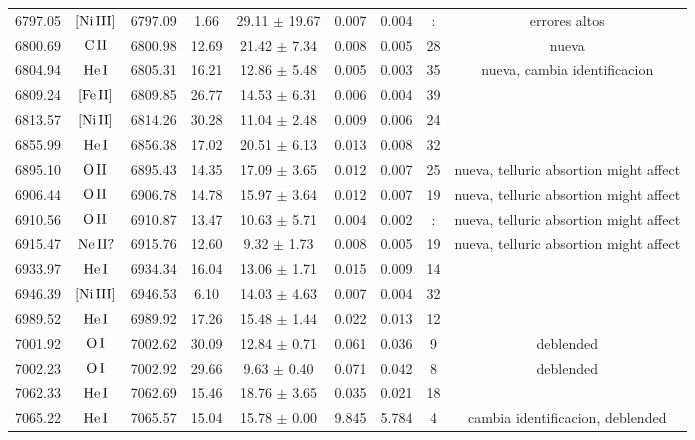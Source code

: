 \documentclass{article}
\begin{document}
\begin{table*}
\begin{adjustbox}{width=\textwidth}
\begin{tabular}{ccccccccc}
6797.05 & $\mbox{[Ni}\thinspace \mbox{III]}$ & 6797.09 & 1.66 & 29.11 $\pm$ 19.67 & 0.007 & 0.004 & : &  errores altos \\
6800.69 & $\mbox{C}\thinspace \mbox{II}$ & 6800.98 & 12.69 & 21.42 $\pm$ 7.34 & 0.008 & 0.005 & 28 &  nueva \\
6804.94 & $\mbox{He}\thinspace \mbox{I}$ & 6805.31 & 16.21 & 12.86 $\pm$ 5.48 & 0.005 & 0.003 & 35 &  nueva, cambia identificacion \\
6809.24 & $\mbox{[Fe}\thinspace \mbox{II]}$ & 6809.85 & 26.77 & 14.53 $\pm$ 6.31 & 0.006 & 0.004 & 39 &  \\
6813.57 & $\mbox{[Ni}\thinspace \mbox{II]}$ & 6814.26 & 30.28 & 11.04 $\pm$ 2.48 & 0.009 & 0.006 & 24 &  \\
6855.99 & $\mbox{He}\thinspace \mbox{I}$ & 6856.38 & 17.02 & 20.51 $\pm$ 6.13 & 0.013 & 0.008 & 32 &  \\
6895.10 & $\mbox{O}\thinspace \mbox{II}$ & 6895.43 & 14.35 & 17.09 $\pm$ 3.65 & 0.012 & 0.007 & 25 &  nueva, telluric absortion might affect \\
6906.44 & $\mbox{O}\thinspace \mbox{II}$ & 6906.78 & 14.78 & 15.97 $\pm$ 3.64 & 0.012 & 0.007 & 19 &  nueva, telluric absortion might affect \\
6910.56 & $\mbox{O}\thinspace \mbox{II}$ & 6910.87 & 13.47 & 10.63 $\pm$ 5.71 & 0.004 & 0.002 & : &  nueva, telluric absortion might affect \\
6915.47 & $\mbox{Ne}\thinspace \mbox{II?}$ & 6915.76 & 12.60 & 9.32 $\pm$ 1.73 & 0.008 & 0.005 & 19 &  nueva, telluric absortion might affect \\
6933.97 & $\mbox{He}\thinspace \mbox{I}$ & 6934.34 & 16.04 & 13.06 $\pm$ 1.71 & 0.015 & 0.009 & 14 &  \\
6946.39 & $\mbox{[Ni}\thinspace \mbox{III]}$ & 6946.53 & 6.10 & 14.03 $\pm$ 4.63 & 0.007 & 0.004 & 32 &  \\
6989.52 & $\mbox{He}\thinspace \mbox{I}$ & 6989.92 & 17.26 & 15.48 $\pm$ 1.44 & 0.022 & 0.013 & 12 &  \\
7001.92 & $\mbox{O}\thinspace \mbox{I}$ & 7002.62 & 30.09 & 12.84 $\pm$ 0.71 & 0.061 & 0.036 & 9 &  deblended \\
7002.23 & $\mbox{O}\thinspace \mbox{I}$ & 7002.92 & 29.66 & 9.63 $\pm$ 0.40 & 0.071 & 0.042 & 8 &  deblended \\
7062.33 & $\mbox{He}\thinspace \mbox{I}$ & 7062.69 & 15.46 & 18.76 $\pm$ 3.65 & 0.035 & 0.021 & 18 &  \\
7065.22 & $\mbox{He}\thinspace \mbox{I}$ & 7065.57 & 15.04 & 15.78 $\pm$ 0.00 & 9.845 & 5.784 & 4 &  cambia identificacion, deblended \\

\end{tabular}
\end{adjustbox}
\end{table*}
\end{document}
